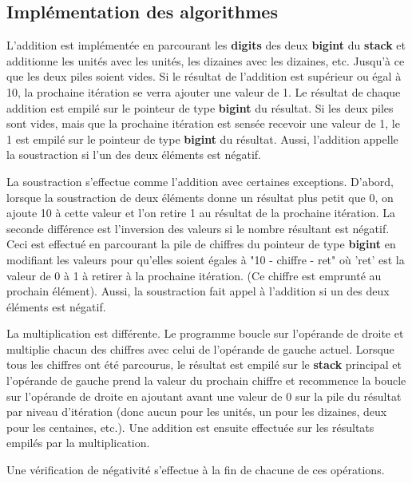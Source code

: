 \documentclass[]{report}
\begin{document}
	\begin{normalsize}
		\section*{\LARGE Implémentation des algorithmes}\vspace{4mm}
		L'addition est implémentée en parcourant les \textbf{digits} des deux \textbf{bigint} du \textbf{stack} et additionne les unités avec les unités, les dizaines avec les dizaines, etc. Jusqu'à ce que les deux piles soient vides. Si le résultat de l'addition est supérieur ou égal à 10, la prochaine itération se verra ajouter une valeur de 1. Le résultat de chaque addition est empilé sur le pointeur de type \textbf{bigint} du résultat. Si les deux piles sont vides, mais que la prochaine itération est sensée recevoir une valeur de 1, le 1 est empilé sur le pointeur de type \textbf{bigint} du résultat. Aussi, l'addition appelle la soustraction si l'un des deux éléments est négatif.
		\vspace{4mm}
		
		\par La soustraction s'effectue comme l'addition avec certaines exceptions. D'abord, lorsque la soustraction de deux éléments donne un résultat plus petit que 0, on ajoute 10 à cette valeur et l'on retire 1 au résultat de la prochaine itération. La seconde différence est l'inversion des valeurs si le nombre résultant est négatif. Ceci est effectué en parcourant la pile de chiffres du pointeur de type \textbf{bigint} en modifiant les valeurs pour qu'elles soient égales à "10 - chiffre - ret" où 'ret' est la valeur de 0 à 1 à retirer à la prochaine itération. (Ce chiffre est emprunté au prochain élément). Aussi, la soustraction fait appel à l'addition si un des deux éléments est négatif.\vspace{4mm}
		
		\par La multiplication est différente. Le programme boucle sur l'opérande de droite et multiplie chacun des chiffres avec celui de l'opérande de gauche actuel. Lorsque tous les chiffres ont été parcourus, le résultat est empilé sur le \textbf{stack} principal et l'opérande de gauche prend la valeur du prochain chiffre et recommence la boucle sur l'opérande de droite en ajoutant avant une valeur de 0 sur la pile du résultat par niveau d'itération (donc aucun pour les unités, un pour les dizaines, deux pour les centaines, etc.). Une addition est ensuite effectuée sur les résultats empilés par la multiplication. \vspace{4mm}
		
		\par Une vérification de négativité s'effectue à la fin de chacune de ces opérations.
		\vspace{4mm}
	\end{normalsize}
\end{document}
